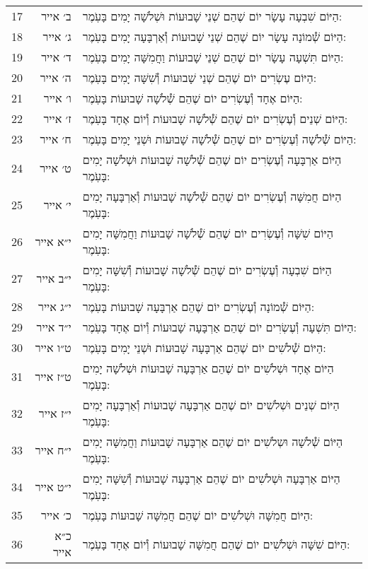 \documentclass[twoside, openany, parskip=half, 11pt]{book}
\begin{document}
\begin{scriptsize}
\begin{longtable}{ l | r | p{} }
17 & ב׳ אייר & הַיּוֹם שִׁבְעָה עָשָׂר יוֹם שֶׁהֵם שְׁנֵי שָׁבוּעוֹת וּשְׁלֹשָׁה יָמִים בָּעֹֽמֶר: \\
18 & ג׳ אייר & הַיּוֹם שְׁ֯מוֹנָה עָשָׂר יוֹם שֶׁהֵם שְׁנֵי שָׁבוּעוֹת וְ֯אַרְבָּעָה יָמִים בָּעֹֽמֶר: \\
19 & ד׳ אייר & הַיּוֹם תִּשְׁעָה עָשָׂר יוֹם שֶׁהֵם שְׁנֵי שָׁבוּעוֹת וַחֲמִשָּׁה יָמִים בָּעֹֽמֶר: \\
20 & ה׳ אייר & הַיּוֹם עֶשְׂרִים יוֹם שֶׁהֵם שְׁנֵי שָׁבוּעוֹת וְ֯שִׁשָּׁה יָמִים בָּעֹֽמֶר: \\
21 & ו׳ אייר & הַיּוֹם אֶחָד וְ֯עֶשְׂרִים יוֹם שֶׁהֵם שְׁ֯לֹשָׁה שָׁבוּעוֹת בָּעֹֽמֶר: \\
22 & ז׳ אייר & הַיּוֹם שְׁנֵים וְ֯עֶשְׂרִים יוֹם שֶׁהֵם שְׁ֯לֹשָׁה שָׁבוּעוֹת וְ֯יוֹם אֶחָד בָּעֹֽמֶר: \\
23 & ח׳ אייר & הַיּוֹם שְׁ֯לֹשָׁה וְ֯עֶשְׂרִים יוֹם שֶׁהֵם שְׁ֯לֹשָׁה שָׁבוּעוֹת וּשְׁנֵי יָמִים בָּעֹֽמֶר: \\
24 & ט׳ אייר & הַיּוֹם אַרְבָּעָה וְ֯עֶשְׂרִים יוֹם שֶׁהֵם שְׁ֯לֹשָׁה שָׁבוּעוֹת וּשְׁלֹשָׁה יָמִים בָּעֹֽמֶר: \\
25 & י׳ אייר & הַיּוֹם חֲמִשָּׁה וְ֯עֶשְׂרִים יוֹם שֶׁהֵם שְׁ֯לֹשָׁה שָׁבוּעוֹת וְ֯אַרְבָּעָה יָמִים בָּעֹֽמֶר: \\
26 & י״א אייר & הַיּוֹם שִׁשָּׁה וְ֯עֶשְׂרִים יוֹם שֶׁהֵם שְׁ֯לֹשָׁה שָׁבוּעוֹת וַחֲמִשָּׁה יָמִים בָּעֹֽמֶר: \\
27 & י״ב אייר & הַיּוֹם שִׁבְעָה וְ֯עֶשְׂרִים יוֹם שֶׁהֵם שְׁ֯לֹשָׁה שָׁבוּעוֹת וְ֯שִׁשָּׁה יָמִים בָּעֹֽמֶר: \\
28 & י״ג אייר & הַיּוֹם שְׁ֯מוֹנָה וְ֯עֶשְׂרִים יוֹם שֶׁהֵם אַרְבָּעָה שָׁבוּעוֹת בָּעֹֽמֶר: \\
29 & י״ד אייר & הַיּוֹם תִּשְׁעָה וְ֯עֶשְׂרִים יוֹם שֶׁהֵם אַרְבָּעָה שָׁבוּעוֹת וְ֯יוֹם אֶחָד בָּעֹֽמֶר: \\
30 & ט״ו אייר & הַיּוֹם שְׁ֯לֹשִׁים יוֹם שֶׁהֵם אַרְבָּעָה שָׁבוּעוֹת וּשְׁנֵי יָמִים בָּעֹֽמֶר: \\
31 & ט״ז אייר & הַיּוֹם אֶחָד וּשְׁלֹשִׁים יוֹם שֶׁהֵם אַרְבָּעָה שָׁבוּעוֹת וּשְׁלֹשָׁה יָמִים בָּעֹֽמֶר: \\
32 & י״ז אייר & הַיּוֹם שְׁנֵים וּשְׁלֹשִׁים יוֹם שֶׁהֵם אַרְבָּעָה שָׁבוּעוֹת וְ֯אַרְבָּעָה יָמִים בָּעֹֽמֶר: \\
33 & י״ח אייר & הַיּוֹם שְׁ֯לֹשָׁה וּשְלֹשִׁים יוֹם שֶׁהֵם אַרְבָּעָה שָׁבוּעוֹת וַחֲמִשָּׁה יָמִים בָּעֹֽמֶר: \\
34 & י״ט אייר & הַיּוֹם אַרְבָּעָה וּשְׁלֹשִׁים יוֹם שֶׁהֵם אַרְבָּעָה שָׁבוּעוֹת וְ֯שִׁשָּׁה יָמִים בָּעֹֽמֶר: \\
35 & כ׳ אייר & הַיּוֹם חֲמִשָּׁה וּשְׁלֹשִׁים יוֹם שֶׁהֵם חֲמִשָּׁה שָׁבוּעוֹת בָּעֹֽמֶר: \\
36 & כ״א אייר & הַיּוֹם שִׁשָּׁה וּשְׁלֹשִׁים יוֹם שֶׁהֵם חֲמִשָּׁה שָׁבוּעוֹת וְ֯יוֹם אֶחָד בָּעֹֽמֶר: \\

\end{longtable}
\end{scriptsize}
\end{document}
